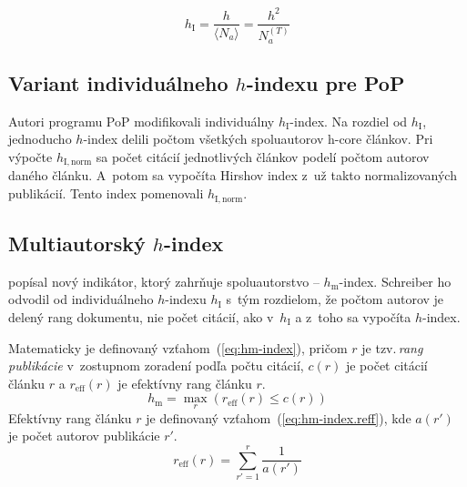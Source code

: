 \begin{equation}
\label{eq:hi-index}
h_{\mathrm{I}} = \frac{h}{\langle N_a \rangle} = \frac{h^2}{N_a^{(T)}}
\end{equation}


\subsection{Variant individuálneho $h$-indexu pre PoP}
\label{sec:hinorm}

Autori programu PoP modifikovali individuálny
$h_{\mathrm{I}}$-index.  Na rozdiel od $h_{\mathrm{I}}$, jednoducho $h$-index
delili počtom všetkých spoluautorov h-core článkov.  Pri výpočte
$h_{\mathrm{I, norm}}$ sa počet citácií jednotlivých článkov podelí počtom
autorov daného článku.  A~potom sa vypočíta Hirshov index z~už takto
normalizovaných publikácií.  Tento index pomenovali $h_{\mathrm{I, norm}}$.


\subsection{Multiautorský $h$-index}
\label{sec:hm-index}

\citet{Schreiber2008} popísal nový indikátor, ktorý zahrňuje spoluautorstvo --
$h_{\mathrm{m}}$-index.  Schreiber ho odvodil od individuálneho $h$-indexu
$h_{\mathrm{I}}$ s~tým rozdielom, že počtom autorov je delený rang dokumentu,
nie počet citácií, ako v~$h_{\mathrm{I}}$ a z~toho sa vypočíta $h$-index.

Matematicky je definovaný vzťahom~(\ref{eq:hm-index}), pričom $r$ je
tzv.\,\emph{rang publikácie} v~zostupnom zoradení podľa počtu citácií, $c(r)$ je
počet citácií článku $r$ a $r_{\mathrm{eff}}(r)$ je efektívny rang článku $r$.
\begin{equation}
\label{eq:hm-index}
h_{\mathrm{m}} = \max_r{(r_{\mathrm{eff}}(r) \leq c(r))}
\end{equation}
Efektívny rang článku $r$ je definovaný vzťahom~(\ref{eq:hm-index.reff}), kde
$a(r')$ je počet autorov publikácie $r'$.
\begin{equation}
\label{eq:hm-index.reff}
r_{\mathrm{eff}}(r) = \sum_{r'=1}^r{\frac{1}{a(r')}}
\end{equation}



